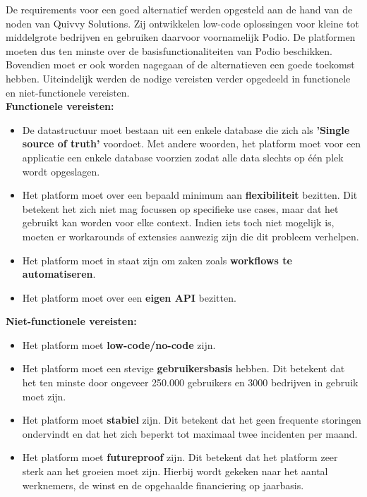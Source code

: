 De requirements voor een goed alternatief werden opgesteld aan de hand van de noden van Quivvy Solutions. Zij ontwikkelen low-code oplossingen voor kleine tot middelgrote bedrijven en gebruiken daarvoor voornamelijk Podio. De platformen moeten dus ten minste over de basisfunctionaliteiten van Podio beschikken. Bovendien moet er ook worden nagegaan of de alternatieven een goede toekomst hebben. Uiteindelijk werden de nodige vereisten verder opgedeeld in functionele en niet-functionele vereisten. \\

\textbf{Functionele vereisten:}

\begin{itemize}
    \item De datastructuur moet bestaan uit een enkele database die zich als \textbf{'Single source of truth'} voordoet. Met andere woorden, het platform moet voor een applicatie een enkele database voorzien zodat alle data slechts op één plek wordt opgeslagen.
    \item Het platform moet over een bepaald minimum aan \textbf{flexibiliteit} bezitten. Dit betekent het zich niet mag focussen op specifieke use cases, maar dat het gebruikt kan worden voor elke context. Indien iets toch niet mogelijk is, moeten er workarounds of extensies aanwezig zijn die dit probleem verhelpen.
    \item Het platform moet in staat zijn om zaken zoals \textbf{workflows te automatiseren}.
    \item Het platform moet over een \textbf{eigen API} bezitten.
\end{itemize}

\textbf{Niet-functionele vereisten:} 

\begin{itemize}
    \item Het platform moet \textbf{low-code/no-code} zijn.
    \item Het platform moet een stevige \textbf{gebruikersbasis} hebben. Dit betekent dat het ten minste door ongeveer 250.000 gebruikers en 3000 bedrijven in gebruik moet zijn.
    \item Het platform moet \textbf{stabiel} zijn. Dit betekent dat het geen frequente storingen ondervindt en dat het zich beperkt tot maximaal twee incidenten per maand.
    \item Het platform moet \textbf{futureproof} zijn. Dit betekent dat het platform zeer sterk aan het groeien moet zijn. Hierbij wordt gekeken naar het aantal werknemers, de winst en de opgehaalde financiering op jaarbasis.
\end{itemize}


